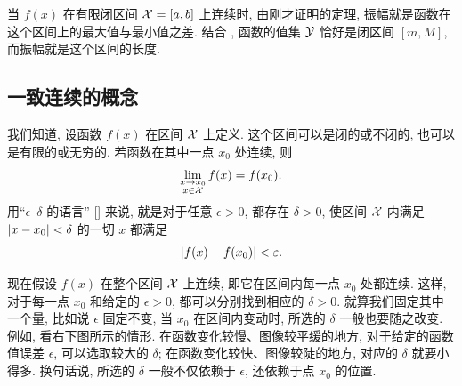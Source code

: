 当 $f(x)$ 在有限闭区间 $\mathcal{X}=[a,b]$ 上连续时,
由刚才证明的定理, 振幅就是函数在这个区间上的最大值与最小值之差.
结合 , 函数的值集 $\mathcal{Y}$ 恰好是闭区间 $[m,M]$,
而振幅就是这个区间的长度.

\subsection{一致连续的概念}\label{subsec:86}
我们知道, 设函数 $f(x)$ 在区间 $\mathcal{X}$ 上定义.
这个区间可以是闭的或不闭的, 也可以是有限的或无穷的.
若函数在其中一点 $x_0$ 处连续, 则
$$
\lim_{\substack{x\to x_0\\x\in\mathcal{X}}}f(x)=f(x_0).
$$
用“$\epsilon$--$\delta$ 的语言” [] 来说,
就是对于任意 $\epsilon>0$, 都存在 $\delta>0$,
使区间 $\mathcal{X}$ 内满足 $\left| x-x_0 \right|<\delta$ 的一切 $x$ 都满足
$$
\left| f(x)-f(x_0) \right|<\varepsilon.
$$

现在假设 $f(x)$ 在整个区间 $\mathcal{X}$ 上连续,
即它在区间内每一点 $x_0$ 处都连续.
这样, 对于每一点 $x_0$ 和给定的 $\epsilon>0$,
都可以分别找到相应的 $\delta>0$.
就算我们固定其中一个量, 比如说 $\epsilon$ 固定不变, 当 $x_0$ 在区间内变动时,
所选的 $\delta$ 一般也要随之改变.
例如, 看右下图所示的情形.
在函数变化较慢、图像较平缓的地方,
对于给定的函数值误差 $\epsilon$, 可以选取较大的 $\delta$;
在函数变化较快、图像较陡的地方, 对应的 $\delta$ 就要小得多.
换句话说, {\kaishu 所选的 $\delta$ 一般不仅依赖于 $\epsilon$,
还依赖于点 $x_0$ 的位置.}

